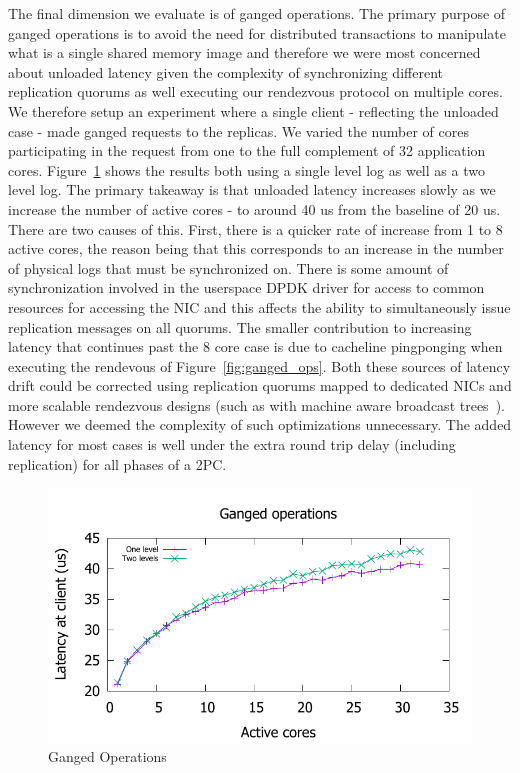 \documentclass[10pt, preprint, nonatbib]{sigplanconf}
\begin{document}
The final dimension we evaluate is of ganged operations. The primary purpose of
ganged operations is to avoid the need for distributed transactions to
manipulate what is a single shared memory image and therefore we were most
concerned about unloaded latency given the complexity of synchronizing different
replication quorums as well executing our rendezvous protocol on multiple
cores. We therefore setup an experiment where a single client - reflecting the
unloaded case - made ganged requests to the replicas. We varied the number of
cores participating in the request from one to the full complement of 32
application cores. Figure~\ref{fig:ganged} shows the results both using a single
level log as well as a two level log. The primary takeaway is that unloaded
latency increases slowly as we increase the number of active cores - to around
40 us from the baseline of 20 us. There are two causes of this. First, there is
a quicker rate of increase from 1 to 8 active cores, the reason being that this
corresponds to an increase in the number of physical logs that must be
synchronized on. There is some amount of synchronization involved in the
userspace DPDK driver for access to common resources for accessing the NIC and
this affects the ability to simultaneously issue replication messages on all
quorums. The smaller contribution to increasing latency that continues past the
8 core case is due to cacheline pingponging when executing the rendevous of
Figure~\ref{fig:ganged_ops}. Both these sources of latency drift could be
corrected using replication quorums mapped to dedicated NICs and more scalable
rendezvous designs (such as with machine aware broadcast
trees~\cite{broadcast_tree}). However we deemed the complexity of such
optimizations unnecessary. The added latency for most cases is well under the
extra round trip delay (including replication) for all phases of a 2PC.

\begin{figure}
\includegraphics[scale=0.6]{results2/multi.pdf}
\caption{Ganged Operations}
\label{fig:ganged}
\end{figure}
\end{document}
